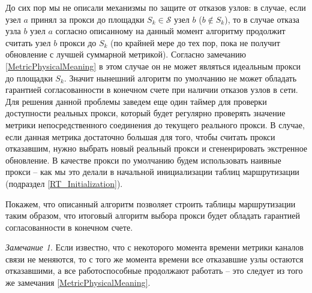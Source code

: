 \documentclass{article}
\theoremstyle{plain}
\theoremstyle{plain}
\theoremstyle{plain}
\theoremstyle{plain}
\theoremstyle{definition}
\theoremstyle{remark}
\newtheorem{remark}{Замечание}[section]
\theoremstyle{plain}
\begin{document}
До сих пор мы не описали механизмы по защите от отказов узлов: в случае, если узел $a$ принял за прокси до площадки $S_k \in \mathcal{S}$ узел $b$ ($b \notin S_k$), то в случае отказа узла $b$ узел $a$ согласно описанному на данный момент алгоритму продолжит считать узел $b$ прокси до $S_k$ (по крайней мере до тех пор, пока не получит обновление с лучшей суммарной метрикой). Согласно замечанию \ref{MetricPhysicalMeaning} в этом случае он не может являться идеальным прокси до площадки $S_k$. Значит нынешний алгоритм по умолчанию не может обладать гарантией согласованности в конечном счете при наличии отказов узлов в сети. Для решения данной проблемы заведем еще один таймер для проверки доступности реальных прокси, который будет регулярно проверять значение метрики непосредственного соединения до текущего реального прокси. В случае, если данная метрика достаточно большая для того, чтобы считать прокси отказавшим, нужно выбрать новый реальный прокси и сгененрировать экстренное обновление. В качестве прокси по умолчанию будем использовать наивные прокси -- как мы это делали в начальной инициализации таблиц маршрутизации (подраздел \ref{RT_Initialization}).

Покажем, что описанный алгоритм позволяет строить таблицы маршрутизации таким образом, что итоговый алгоритм выбора прокси будет обладать гарантией согласованности в конечном счете.

\begin{remark}
\label{NoCrashesWhenMetricIsStable}
    Если известно, что с некоторого момента времени метрики каналов связи не меняются, то с того же момента времени все отказавшие узлы остаются отказавшими, а все работоспособные продолжают работать -- это следует из того же замечания \ref{MetricPhysicalMeaning}.
\end{remark}
\end{document}
